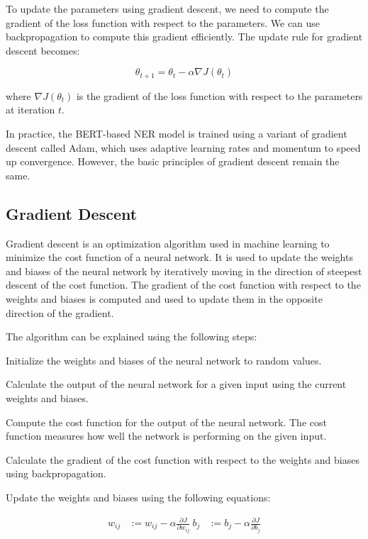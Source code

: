 To update the parameters using gradient descent, we need to compute the gradient of the loss function with respect to the parameters. We can use backpropagation to compute this gradient efficiently. The update rule for gradient descent becomes:

$$\theta_{t+1} = \theta_t - \alpha \nabla J(\theta_t)$$

where $\nabla J(\theta_t)$ is the gradient of the loss function with respect to the parameters at iteration $t$.

In practice, the BERT-based NER model is trained using a variant of gradient descent called Adam, which uses adaptive learning rates and momentum to speed up convergence. However, the basic principles of gradient descent remain the same.



\subsection{Gradient Descent}

Gradient descent is an optimization algorithm used in machine learning to minimize the cost function of a neural network. It is used to update the weights and biases of the neural network by iteratively moving in the direction of steepest descent of the cost function. The gradient of the cost function with respect to the weights and biases is computed and used to update them in the opposite direction of the gradient.

The algorithm can be explained using the following steps:

Initialize the weights and biases of the neural network to random values.

Calculate the output of the neural network for a given input using the current weights and biases.

Compute the cost function for the output of the neural network. The cost function measures how well the network is performing on the given input.

Calculate the gradient of the cost function with respect to the weights and biases using backpropagation.

Update the weights and biases using the following equations:

\begin{align}
w_{ij} &:= w_{ij} - \alpha \frac{\partial J}{\partial w_{ij}} \
b_{j} &:= b_{j} - \alpha \frac{\partial J}{\partial b_{j}}
\end{align}

